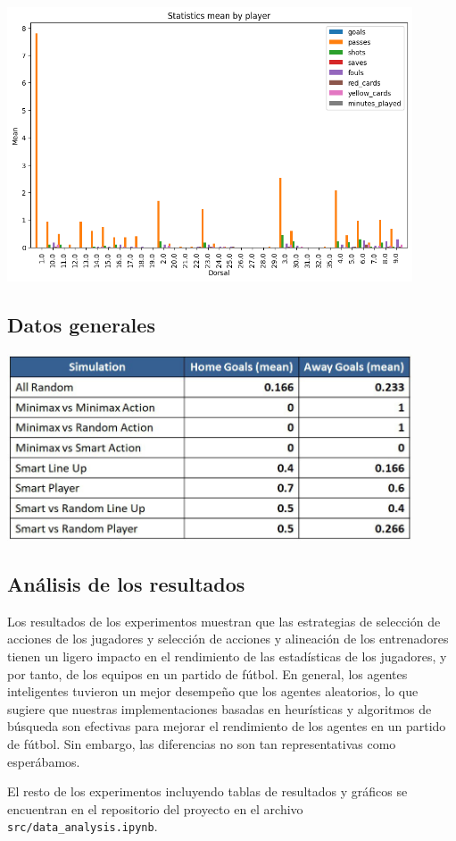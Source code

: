 \documentclass{article}
\begin{document}
\includegraphics[width=0.9\textwidth,height=0.5\textwidth]{images/smart_vs_random_line_up_away.png}

\subsection{Datos generales}

\includegraphics[width=0.9\textwidth]{images/general_data.jpg}

\subsection{Análisis de los resultados}
Los resultados de los experimentos muestran que las estrategias de selección de acciones de los jugadores y selección de acciones y alineación de los entrenadores
tienen un ligero impacto en el rendimiento de las estadísticas de los jugadores, y por tanto, de los equipos en un partido de fútbol. En general, los agentes inteligentes
tuvieron un mejor desempeño que los agentes aleatorios, lo que sugiere que nuestras implementaciones basadas en heurísticas y algoritmos de búsqueda son efectivas para
mejorar el rendimiento de los agentes en un partido de fútbol. Sin embargo, las diferencias no son tan representativas como esperábamos.

El resto de los experimentos incluyendo tablas de resultados y gráficos se encuentran en el repositorio del proyecto en el archivo \texttt{src/data\_analysis.ipynb}.
\end{document}
